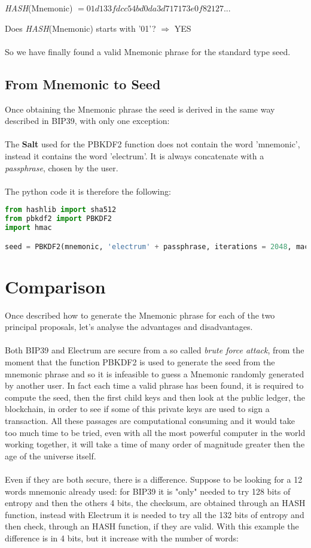 \begin{center}
	\textit{HASH}(Mnemonic) $= 01d133fdcc54bd0da3d717173e0f82127...$
\end{center}
Does \textit{HASH}(Mnemonic) starts with '01'? $\Rightarrow$ YES
\\ \\
So we have finally found a valid Mnemonic phrase for the standard type seed.


\subsection{From Mnemonic to Seed}
Once obtaining the Mnemonic phrase the seed is derived in the same way described in BIP39, with only one exception:
\\ \\
The \textbf{Salt} used for the PBKDF2 function does not contain the word 'mnemonic', instead it contains the word 'electrum'. It is always concatenate with a \textit{passphrase}, chosen by the user.
\\ \\
The python code it is therefore the following:  

\begin{lstlisting}[language=Python]
from hashlib import sha512
from pbkdf2 import PBKDF2
import hmac

seed = PBKDF2(mnemonic, 'electrum' + passphrase, iterations = 2048, macmodule = hmac, digestmodule = sha512).read(64)
\end{lstlisting}


\section{Comparison}
Once described how to generate the Mnemonic phrase for each of the two principal proposals, let's analyse the advantages and disadvantages.
\\ \\
Both BIP39 and Electrum are secure from a so called \textit{brute force attack}, from the moment that the function PBKDF2 is used to generate the seed from the mnemonic phrase and so it is infeasible to guess a Mnemonic randomly generated by another user. In fact each time  a valid phrase has been found, it is required to compute the seed, then the first child keys and then look at the public ledger, the blockchain, in order to see if some of this private keys are used to sign a transaction. All these passages are computational consuming and it would take too much time to be tried, even with all the most powerful computer in the world working together, it will take a time of many order of magnitude greater then the age of the universe itself.
\\ \\
Even if they are both secure, there is a difference. Suppose to be looking for a 12 words mnemonic already used: for BIP39 it is "only" needed to try 128 bits of entropy and then the others 4 bits, the checksum, are obtained through an HASH function, instead with Electrum it is needed to try all the 132 bits of entropy and then check, through an HASH function, if they are valid. With this example the difference is in 4 bits, but it increase with the number of words:

